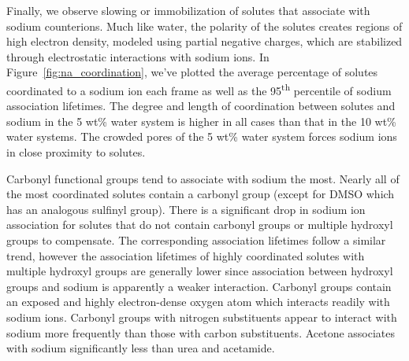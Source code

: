 \documentclass[journal=jpcbfk,manuscript=article]{achemso}
\begin{document}
  Finally, we observe slowing or immobilization of solutes that associate with
  sodium counterions. Much like water, the polarity of the solutes creates 
  regions of high electron density, modeled using partial negative charges, 
  which are stabilized through electrostatic interactions with sodium ions. 
  In Figure~\ref{fig:na_coordination}, we've plotted the average percentage
  of solutes coordinated to a sodium ion each frame as well as the
  95\textsuperscript{th} percentile of sodium association lifetimes. The degree and length of 
  coordination between solutes and sodium in the 5 wt\% water system is higher
  in all cases than that in the 10 wt\% water systems. The crowded pores of 
  the 5 wt\% water system forces sodium ions in close proximity to solutes. 
  
  Carbonyl functional groups tend to associate with sodium the most. Nearly
  all of the most coordinated solutes contain a carbonyl group (except for 
  DMSO which has an analogous sulfinyl group). There is a significant
  drop in sodium ion association for solutes that do not contain carbonyl 
  groups or multiple hydroxyl groups to compensate. The corresponding association
  lifetimes follow a similar trend, however the association lifetimes of highly coordinated 
  solutes with multiple hydroxyl groups are generally lower since association
  between hydroxyl groups and sodium is apparently a weaker interaction. Carbonyl
  groups contain an exposed and highly electron-dense oxygen atom which interacts
  readily with sodium ions. Carbonyl groups with nitrogen substituents appear
  to interact with sodium more frequently than those with carbon substituents. 
  Acetone associates with sodium significantly less than urea and acetamide. 

\end{document}
